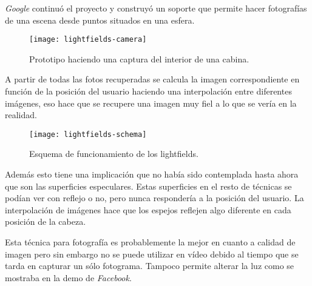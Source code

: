 \textit{Google} continuó el proyecto \cite{GoogleLightfields} y construyó un soporte que permite hacer fotografías de una escena desde puntos situados en una esfera.

\begin{figure}[h]
  \centering
	\texttt{[image: lightfields-camera]}
  \caption{Prototipo haciendo una captura del interior de una cabina.}
  \label{fig:lightfields-camera}
\end{figure}

A partir de todas las fotos recuperadas se calcula la imagen correspondiente en función de la posición del usuario haciendo una interpolación entre diferentes imágenes, eso hace que se recupere una imagen muy fiel a lo que se vería en la realidad. 

\begin{figure}[h]
  \centering
	\texttt{[image: lightfields-schema]}
  \caption{Esquema de funcionamiento de los lightfields.}
  \label{fig:lightfields-schema}
\end{figure}

Además esto tiene una implicación que no había sido contemplada hasta ahora que son las superficies especulares. Estas superficies en el resto de técnicas se podían ver con reflejo o no, pero nunca respondería a la posición del usuario. La interpolación de imágenes hace que los espejos reflejen algo diferente en cada posición de la cabeza.

Esta técnica para fotografía es probablemente la mejor en cuanto a calidad de imagen pero sin embargo no se puede utilizar en vídeo debido al tiempo que se tarda en capturar un sólo fotograma. Tampoco permite alterar la luz como se mostraba en la demo de \textit{Facebook}.











